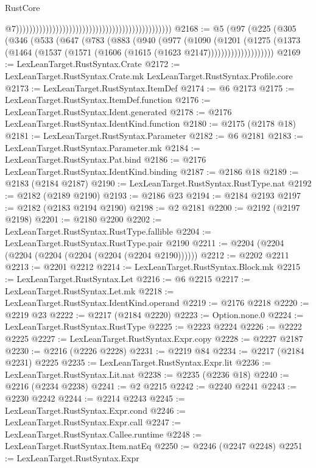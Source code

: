 \begin{lexlean}{RustCore}
\begin{coremodule}
                                                                                                  @7)))))))))))))))))))))))))))))))))))))))))))))))
@2168 := @5
    (@97
      (@225
        (@305
          (@346
            (@533
              (@647
                (@783
                  (@883
                    (@940
                      (@977
                        (@1090
                          (@1201
                            (@1275
                              (@1373
                                (@1464 (@1537 (@1571 (@1606 (@1615 (@1623 @2147))))))))))))))))))))
@2169 := LexLeanTarget.RustSyntax.Crate
@2172 := LexLeanTarget.RustSyntax.Crate.mk LexLeanTarget.RustSyntax.Profile.core
@2173 := LexLeanTarget.RustSyntax.ItemDef
@2174 := @6 @2173
@2175 := LexLeanTarget.RustSyntax.ItemDef.function
@2176 := LexLeanTarget.RustSyntax.Ident.generated
@2178 := @2176 LexLeanTarget.RustSyntax.IdentKind.function
@2180 := @2175 (@2178 @18)
@2181 := LexLeanTarget.RustSyntax.Parameter
@2182 := @6 @2181
@2183 := LexLeanTarget.RustSyntax.Parameter.mk
@2184 := LexLeanTarget.RustSyntax.Pat.bind
@2186 := @2176 LexLeanTarget.RustSyntax.IdentKind.binding
@2187 := @2186 @18
@2189 := @2183 (@2184 @2187)
@2190 := LexLeanTarget.RustSyntax.RustType.nat
@2192 := @2182 (@2189 @2190)
@2193 := @2186 @23
@2194 := @2184 @2193
@2197 := @2182 (@2183 @2194 @2190)
@2198 := @2 @2181
@2200 := @2192 (@2197 @2198)
@2201 := @2180 @2200
@2202 := LexLeanTarget.RustSyntax.RustType.fallible
@2204 := LexLeanTarget.RustSyntax.RustType.pair @2190
@2211 := @2204 (@2204 (@2204 (@2204 (@2204 (@2204 (@2204 @2190))))))
@2212 := @2202 @2211
@2213 := @2201 @2212
@2214 := LexLeanTarget.RustSyntax.Block.mk
@2215 := LexLeanTarget.RustSyntax.Let
@2216 := @6 @2215
@2217 := LexLeanTarget.RustSyntax.Let.mk
@2218 := LexLeanTarget.RustSyntax.IdentKind.operand
@2219 := @2176 @2218
@2220 := @2219 @23
@2222 := @2217 (@2184 @2220)
@2223 := Option.none.{0}
@2224 := LexLeanTarget.RustSyntax.RustType
@2225 := @2223 @2224
@2226 := @2222 @2225
@2227 := LexLeanTarget.RustSyntax.Expr.copy
@2228 := @2227 @2187
@2230 := @2216 (@2226 @2228)
@2231 := @2219 @84
@2234 := @2217 (@2184 @2231) @2225
@2235 := LexLeanTarget.RustSyntax.Expr.lit
@2236 := LexLeanTarget.RustSyntax.Lit.nat
@2238 := @2235 (@2236 @18)
@2240 := @2216 (@2234 @2238)
@2241 := @2 @2215
@2242 := @2240 @2241
@2243 := @2230 @2242
@2244 := @2214 @2243
@2245 := LexLeanTarget.RustSyntax.Expr.cond
@2246 := LexLeanTarget.RustSyntax.Expr.call
@2247 := LexLeanTarget.RustSyntax.Callee.runtime
@2248 := LexLeanTarget.RustSyntax.Item.natEq
@2250 := @2246 (@2247 @2248)
@2251 := LexLeanTarget.RustSyntax.Expr

\end{coremodule}
\end{lexlean}
